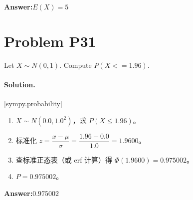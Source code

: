 \documentclass[11pt,a4paper]{ctexart}
\newcommand{\solvertag}[1]{{\footnotesize\color{gray}\textsf{[#1]}}}
\begin{document}
\noindent\textbf{Answer:}\quad $E(X) = 5$

\medskip

\section*{Problem P31}
Let $X \sim N(0,1)$. Compute $P(X <= 1.96)$.

\paragraph{Solution.} \solvertag{sympy.probability} 

\begin{enumerate}[leftmargin=*]
  \item $X \sim N(0.0, 1.0^2)$，求 $P(X \le 1.96)$。
  \item 标准化 $z = \dfrac{x-\mu}{\sigma} = \dfrac{1.96-0.0}{1.0} = 1.9600$。
  \item 查标准正态表（或 erf 计算）得 $\Phi(1.9600) = 0.975002$。
  \item $P = 0.975002$。
\end{enumerate}

\noindent\textbf{Answer:}\quad $0.975002$

\medskip
\end{document}
